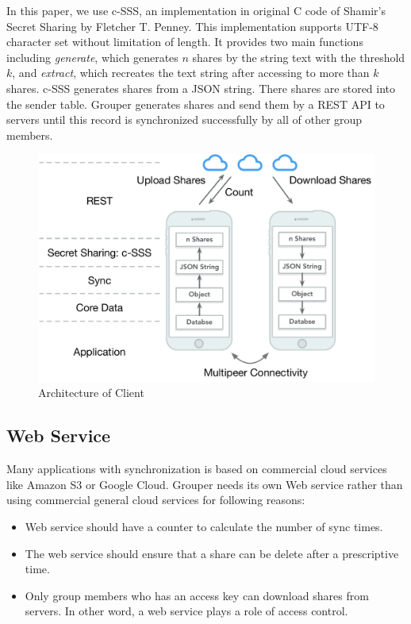 \documentclass[twocolumn,10pt]{article}
\begin{document}
In this paper, we use c-SSS\cite{c-sss}, an implementation in original C code of Shamir's Secret Sharing by Fletcher T. Penney. This implementation supports UTF-8 character set without limitation of length. It provides two main functions including \emph{generate}, which generates $n$ shares by the string text with the threshold $k$, and \emph{extract}, which recreates the text string after accessing to more than $k$ shares. c-SSS generates shares from a JSON string. There shares are stored into the sender table. Grouper generates shares and send them by a REST API to servers until this record is synchronized successfully by all of other group members.

\begin{figure}[t]
\centering
\includegraphics[scale=0.35]{architecture}
\caption{Architecture of Client}
\end{figure}

\subsection{Web Service}
Many applications with synchronization is based on commercial cloud services like Amazon S3 or Google Cloud. Grouper needs its own Web service rather than using commercial general cloud services for following reasons:

\begin{itemize}
\setlength{\itemsep}{1pt}
\setlength{\parskip}{0pt}
\setlength{\parsep}{0pt}
	\item Web service should have a counter to calculate the number of sync times.
    \item The web service should ensure that a share can be delete after a prescriptive time.
    \item Only group members who has an access key can download shares from servers. In other word, a web service plays a role of access control.
\end{itemize}
\end{document}

